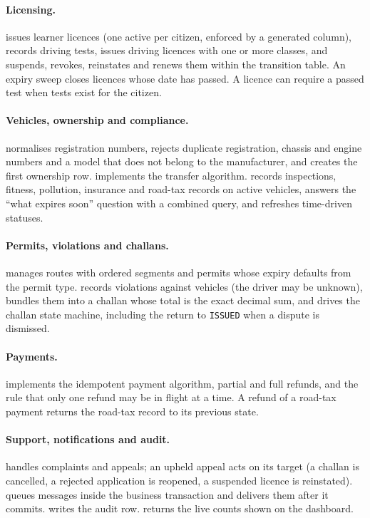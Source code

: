\paragraph{Licensing.}
 issues learner licences (one active per citizen, enforced by a generated
column), records driving tests, issues driving licences with one or more classes, and
suspends, revokes, reinstates and renews them within the transition table. An expiry
sweep closes licences whose date has passed. A licence can require a passed test when tests
exist for the citizen.

\paragraph{Vehicles, ownership and compliance.}
 normalises registration numbers, rejects duplicate registration,
chassis and engine numbers and a model that does not belong to the manufacturer, and
creates the first ownership row.  implements the transfer algorithm.
 records inspections, fitness, pollution, insurance and road-tax
records on active vehicles, answers the ``what expires soon'' question with a combined
query, and refreshes time-driven statuses.

\paragraph{Permits, violations and challans.}
 manages routes with ordered segments and permits whose expiry defaults from
the permit type.  records violations against vehicles (the driver may be
unknown), bundles them into a challan whose total is the exact decimal sum, and drives the
challan state machine, including the return to \texttt{ISSUED} when a dispute is dismissed.

\paragraph{Payments.}
 implements the idempotent payment algorithm, partial and full refunds,
and the rule that only one refund may be in flight at a time. A refund of a road-tax
payment returns the road-tax record to its previous state.

\paragraph{Support, notifications and audit.}
 handles complaints and appeals; an upheld appeal acts on its target
(a challan is cancelled, a rejected application is reopened, a suspended licence is
reinstated).  queues messages inside the business transaction and delivers
them after it commits.  writes the audit row.  returns the
live counts shown on the dashboard.

